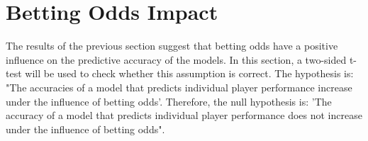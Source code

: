 \section{Betting Odds Impact}

The results of the previous section suggest that betting odds have a positive influence on the predictive accuracy of the models. In this section, a two-sided t-test will be used to check whether this assumption is correct. The hypothesis is: "The accuracies of a model that predicts individual player performance increase under the influence of betting odds'. Therefore, the null hypothesis is: 'The accuracy of a model that predicts individual player performance does not increase under the influence of betting odds".